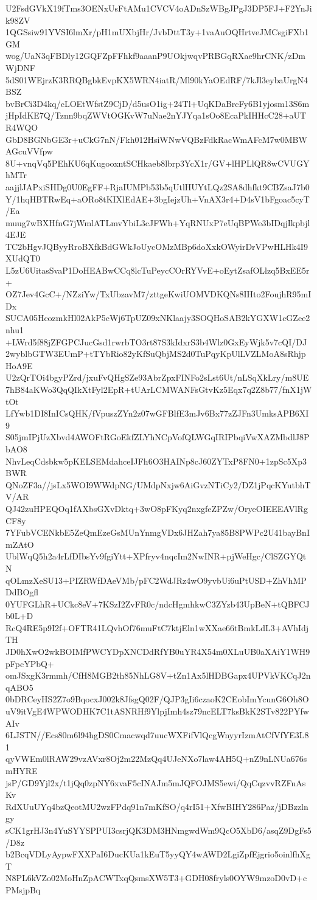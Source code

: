 U2FsdGVkX19fTms3OENxUsFtAMu1CVCV4oADnSzWBgJPgJ3DP5FJ+F2YnJik98ZV
1QGSsiw91YVSI6lmXr/pH1mUXbjHr/JvbDttT3y+1vaAuOQHrtveJMCsgiFXb1GM
wog/UaN3qFBDly12GQFZpFFhkf9aaanP9UOkjwqvPRBGqRXae9hrCNK/zDmWjDNF
5dS01WEjrzK3RRQBgbkEvpKX5WRN4iatR/Ml90kYaOEdRF/7kJl3eybaUrgN4BSZ
bvBrCi3D4kq/cLOEtWfstZ9CjD/d5usO1ig+24Tl+UqKDaBrcFy6B1yjosm13S6m
jHpIdKE7Q/Tznn9bqZWVtOGKvW7uNae2nYJYqa1sOo8EcaPkIHHcC28+aUTR4WQO
GbD8BGNbGE3r+uCkG7nN/Fkh012HsiWNwVQBzFdkRacWmAFcM7w0MBWAGcuVVfpw
8U+vnqVq5PEhKU6qKugooxntSCHkaeb8lbrp3YcX1r/GV+lHPLlQR8wCVUGYhMTr
aajjlJAPxiSHDg0U0EgFF+RjaIUMPb53b5qUtlHUYtLQz2SA8dhfkt9CBZsaJ7b0
Y/1hqHBTRwEq+aORo8tKIXlEdAE+3bgIejzUh+VnAX3r4+D4sV1bFgoac5cyT/Ea
muug7wBXHfnG7jWmlATLmvYbiL3cJFWh+YqRNUxP7eUqBPWe3bIDqjIkpbjl4EJE
TC2bHgvJQByyRroBXfkBdGWkJoUycOMzMBp6doXxkOWyirDrVPwHLHk4I9XUdQT0
L5zU6UitasSvaP1DoHEABwCCq8lcTuPeycCOrRYVvE+oEytZsafOLlzq5BxEE5r+
OZ7Jev4GcC+/NZziYw/TxUbzavM7/zttgeKwiUOMVDKQNs8IHto2FoujhR95mIDx
SUCA05HcozmkHl02AkP5cWj6TpUZ09xNKlaajy3SOQHoSAB2kYGXW1cGZee2nhu1
+LWrd5f88jZFGPCJucGsd1rwrbTO3rt87S3kIdxrS3b4Wlz0GxEyWjk5v7cQI/DJ
2wyblbGTW3EUmP+tTYbRio82yKfSuQbjMS2d0TuPqyKpUlLVZLMoA8sRhjpHoA9E
U2zQrTOi4bgyPZrd/jxuFvQHgSZe93AbrZpxFINFo2sLst6Ut/nLSqXkLry/m8UE
7hB84aKWo3QqQIkXtFyl2EpR+tUArLCMWANFsGtvKz5Eqx7q2Z8b77/fnX1jWtOt
LfYwb1DI8InICsQHK/fVpuszZYn2z07wGFBlfE3mJv6Bx77zZJFn3UmksAPB6XI9
S05jmIPjUzXbvd4AWOFtRGoEkfZLYhNCpVofQLWGqIRIPbqiVwXAZMbdlJ8PbAO8
NhvLeqCdsbkw5pKELSEMdahceIJFh6O3HAINp8cJ60ZYTxP8FN0+1zpSc5Xp3BWR
QNoZF3a//jsLx5WOI9WWdpNG/UMdpNxjw6AiGvzNTiCy2/DZ1jPqcKYutbhTV/AR
QJ42zuHPEQOq1fAXbsGXvDktq+3wO8pFKyq2nxgfeZPZw/OryeOIEEEAVlRgCF8y
7YFubVCENkbE5ZeQmEzeGsMUnYnmgVDx6JHZah7ya85B8PWPc2U41bayBnImZAtO
UblWqQ5h2a4rLfDIbsYv9fgiYtt+XPfryv4nqcIm2NwINR+pjWeHgc/ClSZGYQtN
qOLmzXeSU13+PIZRWfDAeVMb/pFC2WdJRz4wO9yvbUi6uPtUSD+ZhVhMPDdBOgfl
0YUFGLhR+UCkc8eV+7KSzI2ZvFR0c/ndcHgmhkwC3ZYzb43UpBeN+tQBFCJb0L+D
RcQ4RE5p9I2f+OFTR41LQvhOf76muFtC7ktjEln1wXXae66tBmkLdL3+AVhIdjTH
JD0hXwO2wkBOIMfPWCYDpXNCDdRfYB0uYR4X54m0XLuUB0aXAiY1WH9pFpcYPbQ+
omJSxgK3rmmh/CfH8MGB2th85NhLG8V+tZn1Ax5lHDBGapx4UPVkVKCqJ2nqABO5
0bDRCeyHS2Z7o9BqocxJ002k8JfsgQ02F/QJP3gIi6czaoK2CEobImYcunG6Oh8O
uV9itVgE4WPWODHK7C1tASNRHf9YlpjImh4sz79ncELT7ksBkK2STv822PYfwAIv
6LJSTN//Ecs80m6l94hgDS0Cmacwqd7uucWXFifVlQcgWnyyrIzmAtCfVfYE3L81
qyVWEm0lRAW29vzAVxr8Oj2m22MzQq4UJeNXo7law4AH5Q+nZ9nLNUa676smHYRE
jsP/GD9Yjl2x/t1jQq0zpNY6xvaF5cINAJm5mJQFOJMS5ewi/QqCqzvvRZFnAsKv
RdXUuUYq4bzQeotMU2wzFPdq91n7mKfSO/q4rI51+XfwBIHY286Paz/jDBzzlngy
sCK1grHJ3n4YuSYYSPPUI3csrjQK3DM3HNmgwdWm9QcO5XbD6/asqZ9DgFs5/D8z
b2BcqVDLyAypwFXXPaI6DucKUa1kEuT5yyQY4wAWD2LgiZpfEjgrio5oinlfhXgT
N8PL6kVZo02MoHnZpACWTxqQsmsXW5T3+GDH08fryls0OYW9mzoD0vD+cPMsjpBq
